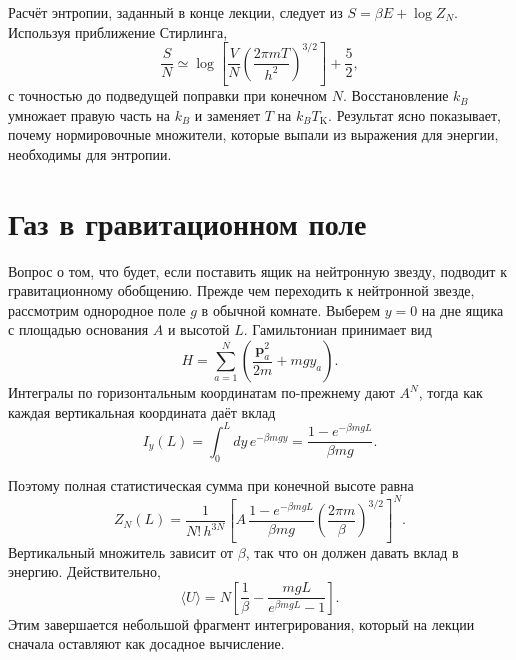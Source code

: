Расчёт энтропии, заданный в конце лекции, следует из \(S=\beta E+\log Z_N\). Используя приближение Стирлинга,
\begin{equation}
 \frac{S}{N}
 \simeq
 \log\!\left[
  \frac{V}{N}
  \left(\frac{2\pi mT}{h^2}\right)^{3/2}
 \right]
 +\frac{5}{2},
 \label{eq:sm4-sackur-tetrode}
\end{equation}
с точностью до подведущей поправки при конечном \(N\). Восстановление \(k_B\) умножает правую часть на \(k_B\) и заменяет \(T\) на \(k_BT_{\mathrm K}\). Результат ясно показывает, почему нормировочные множители, которые выпали из выражения для энергии, необходимы для энтропии.

\section{Газ в гравитационном поле}

Вопрос о том, что будет, если поставить ящик на нейтронную звезду, подводит к гравитационному обобщению. Прежде чем переходить к нейтронной звезде, рассмотрим однородное поле \(g\) в обычной комнате. Выберем \(y=0\) на дне ящика с площадью основания \(A\) и высотой \(L\). Гамильтониан принимает вид
\begin{equation}
 H=\sum_{a=1}^{N}
 \left(\frac{\bm p_a^2}{2m}+mgy_a\right).
 \label{eq:sm4-gravity-hamiltonian}
\end{equation}
Интегралы по горизонтальным координатам по-прежнему дают \(A^N\), тогда как каждая вертикальная координата даёт вклад
\begin{equation}
 I_y(L)
 =\int_0^Ldy\,e^{-\beta mgy}
 =\frac{1-e^{-\beta mgL}}{\beta mg}.
 \label{eq:sm4-finite-height-integral}
\end{equation}

\begin{classroomqa}
\end{classroomqa}

Поэтому полная статистическая сумма при конечной высоте равна
\begin{equation}
 Z_N(L)
 =
 \frac{1}{N!\,h^{3N}}
 \left[
  A\,
  \frac{1-e^{-\beta mgL}}{\beta mg}
  \left(\frac{2\pi m}{\beta}\right)^{3/2}
 \right]^N.
 \label{eq:sm4-gravity-partition-finite}
\end{equation}
Вертикальный множитель зависит от \(\beta\), так что он должен давать вклад в энергию. Действительно,
\begin{equation}
 \langle U\rangle
 =N\left[
  \frac{1}{\beta}
  -\frac{mgL}{e^{\beta mgL}-1}
 \right].
 \label{eq:sm4-finite-gravity-energy}
\end{equation}
Этим завершается небольшой фрагмент интегрирования, который на лекции сначала оставляют как досадное вычисление.

